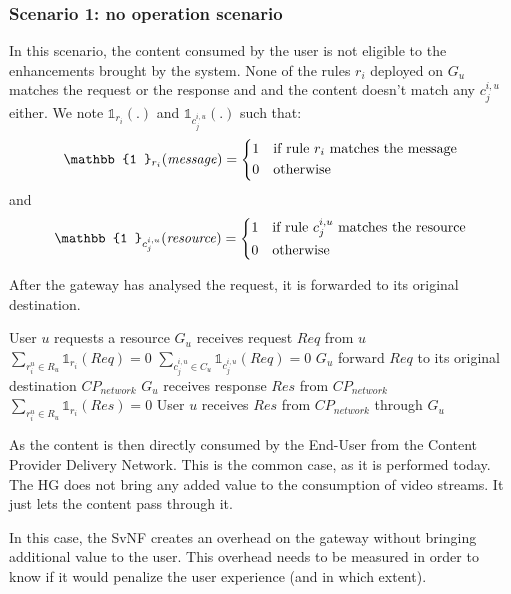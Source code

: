 \subsubsection*{Scenario 1: no operation scenario}

In this scenario, the content consumed by the user is not eligible to the enhancements brought by the system. None of the rules $r_{i}$ deployed on $G_{u}$ matches the request or the response and and the content doesn't match any $c^{i,u}_{j}$ either. We note $\mathbb{1}_{r_{i}}(.)$ and $\mathbb{1}_{c^{i,u}_{j}}(.)$ such that:
\[
    \mathbb{1 }_{r_{i}}(\mathit{message})= 
\begin{dcases}
    1& \text{if rule $r_{i}$ matches the message} \\
    0              & \text{otherwise}
\end{dcases}
\]
and 
\[
    \mathbb{1 }_{c^{i,u}_{j}}(\mathit{resource})= 
\begin{dcases}
    1& \text{if rule $c^{i,u}_{j}$ matches the resource} \\
    0              & \text{otherwise}
\end{dcases}
\]

After the gateway has analysed the request, it is forwarded to its original destination.

\begin{algorithmic}[1]
	
\STATE User $u$ requests a resource
\STATE $G_{u}$ receives request $\mathit{Req}$ from $u$
\STATE \( \sum_{r^{u}_{i}\in R_{u}}{\mathbb{1}_{r_{i}}(\mathit{Req})}=0 \)
\STATE \( \sum_{c^{i,u}_{j}\in C_{u}}{\mathbb{1}_{c^{i,u}_{j}}(\mathit{Req})}=0 \)
\STATE $G_{u}$ forward $\mathit{Req}$ to its original destination \(\mathit{CP}_{\mathit{network}}\)
\STATE $G_{u}$ receives response $\mathit{Res}$ from \(\mathit{CP}_{\mathit{network}}\)
\STATE \( \sum_{r^{u}_{i}\in R_{u}}{\mathbb{1}_{r_{i}}(\mathit{Res})}=0 \)
\STATE User $u$ receives $\mathit{Res}$ from \(\mathit{CP}_{\mathit{network}}\) through $G_{u}$
\end{algorithmic}


As the content is then directly consumed by the End-User from the Content Provider Delivery Network.
This is the common case, as it is performed today. The HG does not bring any added value to the consumption of video streams. It just lets the content pass through it.

In this case, the SvNF creates an overhead on the gateway without bringing additional value to the user.
This overhead needs to be measured in order to know if it would penalize the user experience (and in which extent).

